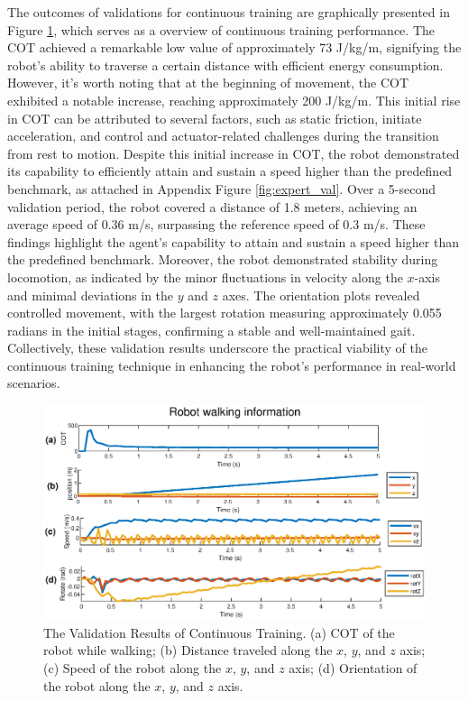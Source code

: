 The outcomes of validations for continuous training are graphically presented in Figure \ref{fig:CT}, which serves as a overview of continuous training performance. The COT achieved a remarkable low value of approximately 73 J/kg/m, signifying the robot's ability to traverse a certain distance with efficient energy consumption. However, it's worth noting that at the beginning of movement, the COT exhibited a notable increase, reaching approximately 200 J/kg/m. This initial rise in COT can be attributed to several factors, such as static friction, initiate acceleration, and control and actuator-related challenges during the transition from rest to motion. Despite this initial increase in COT, the robot demonstrated its capability to efficiently attain and sustain a speed higher than the predefined benchmark, as attached in Appendix Figure \ref{fig:expert_val}. Over a 5-second validation period, the robot covered a distance of 1.8 meters, achieving an average speed of 0.36 m/s, surpassing the reference speed of 0.3 m/s. These findings highlight the agent's capability to attain and sustain a speed higher than the predefined benchmark. Moreover, the robot demonstrated stability during locomotion, as indicated by the minor fluctuations in velocity along the $x$-axis and minimal deviations in the $y$ and $z$ axes. The orientation plots revealed controlled movement, with the largest rotation measuring approximately 0.055 radians in the initial stages, confirming a stable and well-maintained gait. Collectively, these validation results underscore the practical viability of the continuous training technique in enhancing the robot's performance in real-world scenarios.

\begin{figure}[htb]
    \centering
    \includegraphics[width=0.9\linewidth]{img/chap5/best_CL.eps}
    \caption{The Validation Results of Continuous Training. (a) COT of the robot while walking; (b) Distance traveled along the $x$, $y$, and $z$ axis; (c) Speed of the robot along the $x$, $y$, and $z$ axis; (d) Orientation of the robot along the $x$, $y$, and $z$ axis.}
    \label{fig:CT}
\end{figure}

